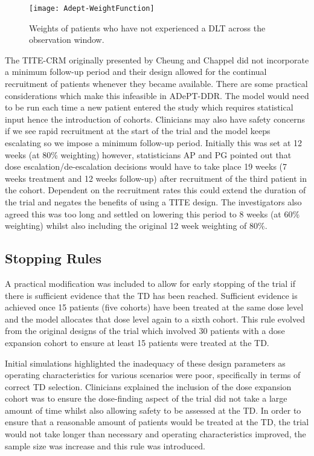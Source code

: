 \begin{figure}[h!]
	\centering
	\caption[Weight function across the follow-up period.]{Weights of patients who have not experienced a DLT across the observation window.}
	\label{fig_adept:weight_function}
	\texttt{[image: Adept-WeightFunction]}
\end{figure}


The TITE-CRM originally presented by Cheung and Chappel \cite{cheungSequentialDesignsPhase2000} did not incorporate a minimum follow-up period and their design allowed for the continual recruitment of patients whenever they became available. There are some practical considerations which make this infeasible in ADePT-DDR. The model would need to be run each time a new patient entered the study which requires statistical input hence the introduction of cohorts. Clinicians may also have safety concerns if we see rapid recruitment at the start of the trial and the model keeps escalating so we impose a minimum follow-up period. Initially this was set at 12 weeks (at 80\% weighting) however, statisticians AP and PG  pointed out that dose escalation/de-escalation decisions would have to take place 19 weeks (7 weeks treatment and 12 weeks follow-up) after recruitment of the third patient in the cohort. Dependent on the recruitment rates this could extend the duration of the trial and negates the benefits of using a TITE design. The investigators also agreed this was too long and settled on lowering this period to 8 weeks (at 60\% weighting) whilst also including the original 12 week weighting of 80\%.


\subsection{Stopping Rules}
\label{adept:Stopping-rules}

A practical modification was included to allow for early stopping of the trial if there is sufficient evidence that the TD has been reached. Sufficient evidence is achieved once 15 patients (five cohorts) have been treated at the same dose level and the model allocates that dose level again to a sixth cohort. This rule evolved from the original designs of the trial which involved 30 patients with a dose expansion cohort to ensure at least 15 patients were treated at the TD. 

Initial simulations highlighted the inadequacy of these design parameters as operating characteristics for various scenarios were poor, specifically in terms of correct TD selection. Clinicians explained the inclusion of the dose expansion cohort was to ensure the dose-finding aspect of the trial did not take a large amount of time whilst also allowing safety to be assessed at the TD. In order to ensure that a reasonable amount of patients would be treated at the TD, the trial would not take longer than necessary and operating characteristics improved, the sample size was increase and this rule was introduced.

